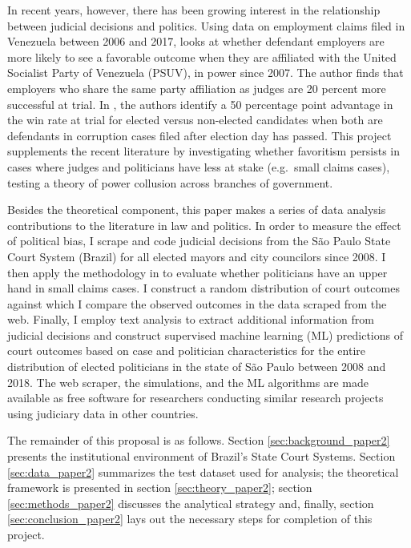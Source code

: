 \documentclass[11pt]{article}
\begin{document}
In recent years, however, there has been growing interest in the relationship between judicial decisions and politics. Using data on employment claims filed in Venezuela between 2006 and 2017, \citet{Sanchez-MartinezDismantlingInstitutionsCourt2018} looks at whether defendant employers are more likely to see a favorable outcome when they are affiliated with the United Socialist Party of Venezuela (PSUV), in power since 2007. The author finds that employers who share the same party affiliation as judges are 20 percent more successful at trial. In \citet{LambaisJudicialSubversionEvidence2018}, the authors identify a 50 percentage point advantage in the win rate at trial for elected versus non-elected candidates when both are defendants in corruption cases filed after election day has passed. This project supplements the recent literature by investigating whether favoritism persists in cases where judges and politicians have less at stake (e.g.~small claims cases), testing a theory of power collusion across branches of government.

Besides the theoretical component, this paper makes a series of data analysis contributions to the literature in law and politics. In order to measure the effect of political bias, I scrape and code judicial decisions from the São Paulo State Court System (Brazil) for all elected mayors and city councilors since 2008. I then apply the methodology in \citet{AbramsJudgesVaryTheir2012} to evaluate whether politicians have an upper hand in small claims cases. I construct a random distribution of court outcomes against which I compare the observed outcomes in the data scraped from the web. Finally, I employ text analysis to extract additional information from judicial decisions and construct supervised machine learning (ML) predictions of court outcomes based on case and politician characteristics for the entire distribution of elected politicians in the state of São Paulo between 2008 and 2018. The web scraper, the simulations, and the ML algorithms are made available as free software for researchers conducting similar research projects using judiciary data in other countries.

The remainder of this proposal is as follows. Section \ref{sec:background_paper2} presents the institutional environment of Brazil's State Court Systems. Section \ref{sec:data_paper2} summarizes the test dataset used for analysis; the theoretical framework is presented in section \ref{sec:theory_paper2}; section \ref{sec:methods_paper2} discusses the analytical strategy and, finally, section \ref{sec:conclusion_paper2} lays out the necessary steps for completion of this project.
\end{document}
